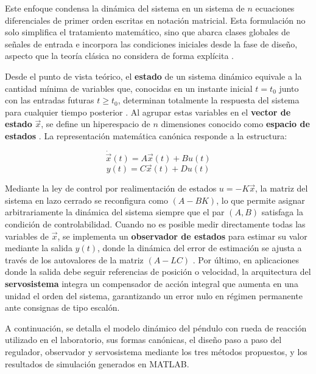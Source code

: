 \documentclass[conference]{IEEEtran}
\begin{document}
Este enfoque condensa la dinámica del sistema en un sistema de $n$ ecuaciones diferenciales de primer orden escritas en notación matricial. Esta formulación no solo simplifica el tratamiento matemático, sino que abarca clases globales de señales de entrada e incorpora las condiciones iniciales desde la fase de diseño, aspecto que la teoría clásica no considera de forma explícita \cite{ogata_discreto}.

Desde el punto de vista teórico, el \textbf{estado} de un sistema dinámico equivale a la cantidad mínima de variables que, conocidas en un instante inicial $t=t_0$ junto con las entradas futuras $t \geq t_0$, determinan totalmente la respuesta del sistema para cualquier tiempo posterior \cite{ogata_discreto}. Al agrupar estas variables en el \textbf{vector de estado} $\vec{x}$, se define un hiperespacio de $n$ dimensiones conocido como \textbf{espacio de estados} \cite{kuo_digital}. La representación matemática canónica responde a la estructura:

\begin{equation}
\dot{\vec{x}}(t) = A\vec{x}(t) + Bu(t)
\end{equation}
\begin{equation}
y(t) = C\vec{x}(t) + Du(t)
\end{equation}

Mediante la ley de control por realimentación de estados $u = -K\vec{x}$, la matriz del sistema en lazo cerrado se reconfigura como $(A - BK)$, lo que permite asignar arbitrariamente la dinámica del sistema siempre que el par $(A,B)$ satisfaga la condición de controlabilidad. Cuando no es posible medir directamente todas las variables de $\vec{x}$, se implementa un \textbf{observador de estados} para estimar su valor mediante la salida $y(t)$, donde la dinámica del error de estimación se ajusta a través de los autovalores de la matriz $(A - LC)$ \cite{unam_tutorial}. Por último, en aplicaciones donde la salida debe seguir referencias de posición o velocidad, la arquitectura del \textbf{servosistema} integra un compensador de acción integral que aumenta en una unidad el orden del sistema, garantizando un error nulo en régimen permanente ante consignas de tipo escalón.

A continuación, se detalla el modelo dinámico del péndulo con rueda de reacción utilizado en el laboratorio, sus formas canónicas, el diseño paso a paso del regulador, observador y servosistema mediante los tres métodos propuestos, y los resultados de simulación generados en MATLAB.
\end{document}
